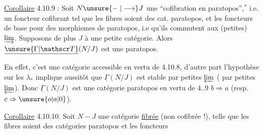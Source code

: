 \uline{Corollaire} 4.10.9 : Soit $N\unsure{\mathrel{-}|\longrightarrow}J$ une ``cofibration en paratopos'',$^*$ i.e. un foncteur cofibrant tel que les fibres soient des cat. paratopos, et les foncteurs
 de base  pour des morphismes de paratopos, i.e qu'ils commutent aux (petites) $\varinjlim$. Supposons de plus $J$  à une petite catégorie. Alors $\underline{\unsure{\Gamma|\mathscr T}}(N/J)$ est une  paratopos.

En effet, c'est une catégorie accessible en vertu de 4.10.8, d'autre part l'hypothèse sur les $\lambda_*$ implique aussitôt que  $\underline{\Gamma}(N/J)$ est stable par petites $\varprojlim$ ( par petites $\varprojlim$). Donc $\underline{\Gamma}(N/J)$ est une catégorie paratopos en vertu de 4..9 $b\Longrightarrow a$ (resp. $c\Rightarrow\unsure{o|a|0}$).

\uline{Corollaire} 4.10.10. Soit $N\mathrel{-}J$ une catégorie \uline{fibrée} (non cofibrée !), telle que les fibres soient des catégories paratopos et les foncteurs
